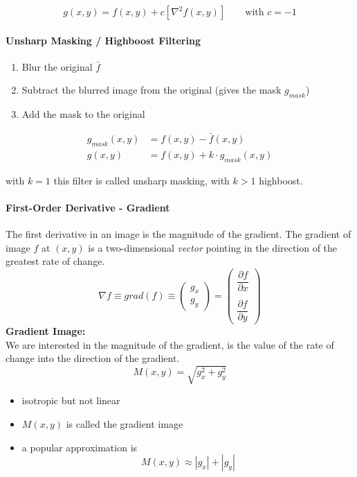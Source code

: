 \begin{equation}
g(x,y) = f(x,y) + c \left[ \nabla^2f(x,y) \right] \qquad \textrm{with } c=-1
\end{equation}

\newpage
\paragraph{Unsharp Masking / Highboost Filtering }
\begin{enumerate}
\item Blur the original $\bar{f}$
\item Subtract the blurred image from the original (gives the mask $g_{mask}$)
\item Add the mask to the original
\end{enumerate}
\begin{align}
g_{mask}(x,y) &= f(x,y) - \bar{f}(x,y) \\
g(x,y) &= f(x,y) + k \cdot g_{mask}(x,y)
\end{align}

with $k=1$ this filter is called unsharp masking, with $k>1$ highboost.

\paragraph{First-Order Derivative - Gradient }
The first derivative in an image is the magnitude of the gradient.
The gradient of image $f$ at $(x,y)$ is a two-dimensional \emph{vector} pointing in the direction of the greatest rate of change.
\begin{equation}
\nabla f \equiv grad(f) \equiv \begin{pmatrix}g_x\\g_y\end{pmatrix} = \begin{pmatrix} \dfrac{\partial f}{\partial x} \\ \\ \dfrac{\partial f}{\partial y} \end{pmatrix}
\end{equation}
\textbf{Gradient Image:}\\
 We are interested in the magnitude of the gradient, is the value of the rate of change into the direction of the gradient.
\begin{equation}
M(x,y) = \sqrt{g_x^2 + g_y^2}
\end{equation}
\begin{itemize}
\item isotropic but not linear
\item $M(x,y)$ is called the gradient image
\item a popular approximation is 
  \[M(x,y) \approx |g_x| + |g_y|\]
\end{itemize}

